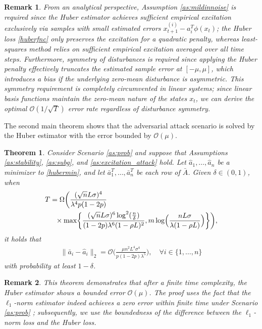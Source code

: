 \documentclass[letterpaper,10pt,conference]{ieeeconf}
\theoremstyle{plain} %
\newtheorem{theorem}{Theorem}
\theoremstyle{plain} %
\theoremstyle{plain} %
\theoremstyle{plain}
\newtheorem{remark}{Remark}
\begin{document}
\begin{remark}
  From an analytical perspective, Assumption \ref{as:mildinnoise} is required since the Huber estimator achieves sufficient empirical excitation exclusively via samples with small estimated errors $x_{t+1}^{(i)}-a_i^T\phi(x_t)$; the Huber loss \eqref{huberfnc} only preserves the excitation for a quadratic penalty, whereas least-squares method relies on sufficient empirical excitation averaged over all time steps. Furthermore, symmetry of disturbances is required since applying the Huber penalty effectively truncates the estimated sample error  at $[-\mu, \mu]$, which introduces a bias if the underlying zero-mean disturbance is asymmetric.  This symmetry requirement is completely circumvented in linear systems; since linear basis functions maintain the zero-mean nature of the states $x_t$, we can derive the optimal $\mathcal{O}(1/\sqrt{T})$ error rate regardless of disturbance symmetry.
\end{remark}

The second main theorem shows that the adversarial attack scenario is solved by the Huber estimator with the error bounded by $\mathcal{O}(\mu)$.

\begin{theorem}\label{attackscenario}
     Consider Scenario \ref{as:prob} and suppose that Assumptions \ref{as:stability}, \ref{as:subg}, and \ref{as:excitation_attack} hold.  Let $\hat a_1, \dots, \hat a_n$ be a minimizer to \eqref{hubermin}, and let $\bar a_1^T, \dots, \bar a_n^T$ be each row of $\bar A$. Given $\delta\in(0,1)$, when 
\begin{align}\label{timeboundattack}
      &  T=\Omega\biggr(\frac{(\sqrt{n}L\sigma)^4}{\lambda^4p(1-2p) } \\\nonumber&\hspace{5mm} \times \max\biggr\{   \frac{(\sqrt{n}L\sigma)^{6}\log^2(\frac{n}{\delta})}{(1-2p)\lambda^{6}(1-\rho L)^2 } , m\log\Bigr( \frac{nL\sigma }{\lambda(1-\rho L)}\Bigr) \biggr\}  \biggr),
    \end{align}
it holds that
\begin{align*}
        \|\bar a_i - \hat a_i\|_2 = \mathcal{O}\Bigr(\frac{\mu n^2 L^4\sigma^4 }{p(1-2p)\lambda^5} \Bigr), \quad \forall i\in\{1,\dots, n\}
    \end{align*}
with probability at least $1-\delta$.
\end{theorem}



\begin{remark}
This theorem demonstrates that after a finite time complexity, the Huber estimator shows a bounded error $\mathcal{O}(\mu)$. The proof uses the fact that the $\ell_1$-norm estimator indeed achieves a zero error within  finite time  under Scenario \ref{as:prob} \cite{kim2024prevailing}; subsequently, we use the boundedness of the difference between the $\ell_1$-norm loss and the Huber loss. 
\end{remark}
\end{document}
